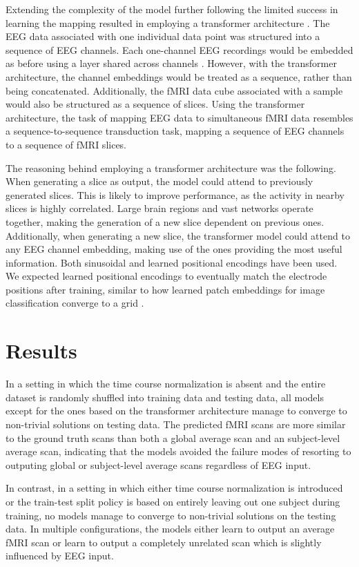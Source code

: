 \documentclass{article}
\begin{document}
Extending the complexity of the model further following the limited success in learning the mapping resulted in employing a transformer architecture \cite{vaswani_attention_2017}. The EEG data associated with one individual data point was structured into a sequence of EEG channels. Each one-channel EEG recordings would be embedded as before using a layer shared across channels \cite{dosovitskiy_image_2020}. However, with the transformer architecture, the channel embeddings would be treated as a sequence, rather than being concatenated. Additionally, the fMRI data cube associated with a sample would also be structured as a sequence of slices. Using the transformer architecture, the task of mapping EEG data to simultaneous fMRI data resembles a sequence-to-sequence transduction task, mapping a sequence of EEG channels to a sequence of fMRI slices.

The reasoning behind employing a transformer architecture was the following. When generating a slice as output, the model could attend to previously generated slices. This is likely to improve performance, as the activity in nearby slices is highly correlated. Large brain regions and vast networks operate together, making the generation of a new slice dependent on previous ones. Additionally, when generating a new slice, the transformer model could attend to any EEG channel embedding, making use of the ones providing the most useful information. Both sinusoidal and learned positional encodings have been used. We expected learned positional encodings to eventually match the electrode positions after training, similar to how learned patch embeddings for image classification converge to a grid \cite{dosovitskiy_image_2020}.

\section{Results}

In a setting in which the time course normalization is absent and the entire dataset is randomly shuffled into training data and testing data, all models except for the ones based on the transformer architecture manage to converge to non-trivial solutions on testing data. The predicted fMRI scans are more similar to the ground truth scans than both a global average scan and an subject-level  average scan, indicating that the models avoided the failure modes of resorting to outputing global or subject-level average scans regardless of EEG input.

In contrast, in a setting in which either time course normalization is introduced or the train-test split policy is based on entirely leaving out one subject during training, no models manage to converge to non-trivial solutions on the testing data. In multiple configurations, the models either learn to output an average fMRI scan or learn to output a completely unrelated scan which is slightly influenced by EEG input.
\end{document}
